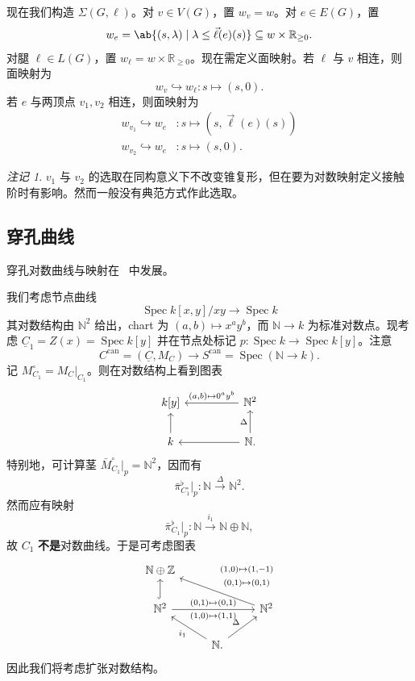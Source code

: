 \documentclass{amsart}
\theoremstyle{definition}
\theoremstyle{remark}
\newtheorem{rmk}[thm]{注记}
\theoremstyle{plain}
\theoremstyle{definition}
\theoremstyle{remark}
\newcommand{\N}{\mathbb{N}}
\newcommand{\R}{\mathbb{R}}
\newcommand{\Z}{\mathbb{Z}}
\newcommand{\on}[1]{\operatorname{#1}}
\newcommand{\ul}[1]{\underline{#1}}
\newcommand{\1}{\mathbf{1}}
\newcommand{\2}{\mathbf{2}}
\newcommand{\3}{\mathbf{3}}
\DeclareMathOperator{\Spec}{Spec}
\begin{document}
现在我们构造 \(\Sigma(G, \ell)\)。对 \(v \in V(G)\)，置 \(w_v = w\)。对 \(e \in E(G)\)，置
\[ w_e = \ab\{ (s, \lambda) \mid \lambda \leq \vec{\ell}(e)(s) \} \subseteq w \times \R_{\geq 0}. \]
对腿 \(\ell \in L(G)\)，置 \(w_{\ell} = w \times \R_{\geq 0}\)。现在需定义面映射。若 \(\ell\) 与 \(v\) 相连，则面映射为
\[ w_v \hookrightarrow w_{\ell} \colon s \mapsto (s, 0). \]
若 \(e\) 与两顶点 \(v_1, v_2\) 相连，则面映射为
\begin{align*}
    w_{v_1} \hookrightarrow w_e &\colon s \mapsto (s, \vec{\ell}(e)(s)) \\
    w_{v_2} \hookrightarrow w_e & \colon s \mapsto (s, 0).
\end{align*}
\begin{rmk}
    \(v_1\) 与 \(v_2\) 的选取在同构意义下不改变锥复形，但在要为对数映射定义接触阶时有影响。然而一般没有典范方式作此选取。
\end{rmk}

\subsection{穿孔曲线}%
\label{sub:Punctured curves}

穿孔对数曲线与映射在~\cite{ACGS2025} 中发展。

我们考虑节点曲线
\[ \Spec k[x,y]/xy \to \Spec k \]
其对数结构由 \(\N^2\) 给出，chart 为 \((a,b) \mapsto x^a y^b\)，而 \(\N \to k\) 为标准对数点。现考虑 \(\ul{C}_1 = Z(x) = \Spec k[y]\) 并在节点处标记 \(p \colon \Spec k \to \Spec k[y]\)。注意
\[ C^{\on{can}} = (\ul{C}, M_C) \to S^{\on{can}} = \Spec(\N \to k). \]
记 \(M_{C_1}^{\circ} = M_C|_{C_1}\)。则在对数结构上看到图表
\begin{equation*}
\begin{tikzcd}
    k[y] & & \N^2 \ar{ll}[swap]{(a,b) \mapsto 0^a y^b} \\
    k \ar{u} & & \N \ar{ll} \ar{u}{\Delta}.
\end{tikzcd}
\end{equation*}
特别地，可计算茎 \(\bar{M}_{C_1}^{\circ}|_p = \N^2\)，因而有
\[ \bar{\pi}_{C_1^{\circ}}^{\flat} |_p \colon \N \xrightarrow{\Delta} \N^2. \]
然而应有映射
\[ \bar{\pi}^{\flat}_{C_1}|_p \colon \N \xrightarrow{i_1} \N \oplus \N, \]
故 \(C_1\) \textbf{不是}对数曲线。于是可考虑图表
\begin{equation*}
\begin{tikzcd}
    \N \oplus \Z \\
    \N^2 \ar[hookrightarrow]{u} \ar{rr}{(0,1)\mapsto (0,1)}[swap]{(1,0)\mapsto (1,1)} & & \N^2 \ar{ull}[swap]{\Vectorstack{{(1,0)\mapsto(1,-1)} {(0,1)\mapsto(0,1)}}} \\
    & \N \ar{ul}{i_1} \ar{ur}{\Delta}.
\end{tikzcd}
\end{equation*}
因此我们将考虑扩张对数结构。
\end{document}
